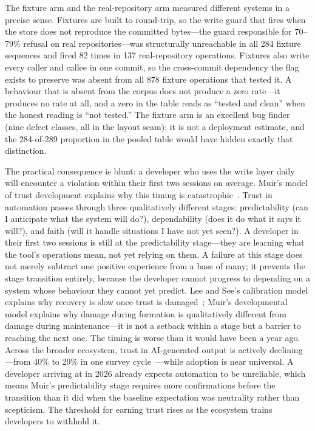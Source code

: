 The fixture arm and the real-repository arm measured different systems in a
precise sense. Fixtures are built to round-trip, so the write guard that fires
when the store does not reproduce the committed bytes---the guard responsible
for 70--79\% refusal on real repositories---was structurally unreachable in all
284 fixture sequences and fired 82 times in 137 real-repository operations.
Fixtures also write every caller and callee in one commit, so the
cross-commit dependency the  flag exists to preserve
was absent from all 878 fixture operations that tested it. A behaviour that
is absent from the corpus does not produce a zero rate---it produces no rate
at all, and a zero in the table reads as ``tested and clean'' when the honest
reading is ``not tested.'' The fixture arm is an excellent bug finder (nine
defect classes, all in the layout seam); it is not a deployment estimate, and
the 284-of-289 proportion in the pooled table would have hidden exactly that
distinction.

The practical consequence is blunt: a developer who uses the write layer daily
will encounter a violation within their first two sessions on average. Muir's
model of trust development explains why this timing is
catastrophic~\cite{muir1994}. Trust in automation passes through three
qualitatively different stages: predictability (can I anticipate what the system
will do?), dependability (does it do what it says it will?), and faith (will it
handle situations I have not yet seen?). A developer in their first two sessions
is still at the predictability stage---they are learning what the tool's
operations mean, not yet relying on them. A failure at this stage does not merely
subtract one positive experience from a base of many; it prevents the stage
transition entirely, because the developer cannot progress to depending on a
system whose behaviour they cannot yet predict. Lee and See's calibration model
explains why recovery is slow once trust is damaged~\cite{lee2004}; Muir's
developmental model explains why damage during formation is qualitatively
different from damage during maintenance---it is not a setback within a stage but
a barrier to reaching the next one. The timing is worse than it would have been
a year ago. Across the broader ecosystem, trust in AI-generated output is
actively declining---from 40\% to 29\% in one survey
cycle~\cite{stackoverflow2025}---while adoption is near universal. A developer
arriving at \sgt{} in 2026 already expects automation to be unreliable, which
means Muir's predictability stage requires more confirmations before the
transition than it did when the baseline expectation was neutrality rather than
scepticism. The threshold for earning trust rises as the ecosystem trains
developers to withhold it.

